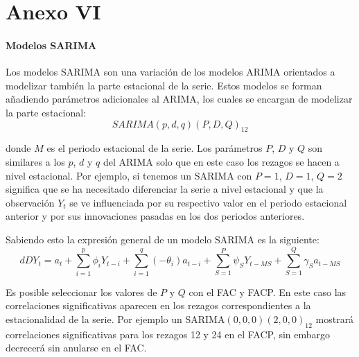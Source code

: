 \documentclass[12pt,a4paper,oneside]{article}
\begin{document}
\part*{Anexo VI}

\subsection*{Modelos SARIMA}
Los modelos SARIMA son una variación de los modelos ARIMA orientados a modelizar también la parte estacional de la serie. Estos modelos se forman añadiendo parámetros adicionales al ARIMA, los cuales se encargan de modelizar la parte estacional:
\begin{equation}
    SARIMA(p,d,q)(P,D,Q)_{12}
\end{equation}

\noindent donde $M$ es el periodo estacional de la serie. Los parámetros $P$, $D$ y $Q$ son similares a los $p$, $d$ y $q$ del ARIMA solo que en este caso los rezagos se hacen a nivel estacional. Por ejemplo, si tenemos un SARIMA con $P = 1$, $D = 1$, $Q = 2$ significa que se ha necesitado diferenciar la serie a nivel estacional y que la observación $Y_t$ se ve influenciada por su respectivo valor en el periodo estacional anterior y por sus innovaciones pasadas en los dos periodos anteriores.

Sabiendo esto la expresión general de un modelo SARIMA es la siguiente:
\begin{equation}
dDY_t = a_{t} + \sum_{i=1}^{p} \phi_{i} Y_{t-i} + \sum_{i=1}^{q} (-\theta_{i}) a_{t-i} + \sum_{S=1}^{P} \psi_{S} Y_{t-MS} + \sum_{S=1}^{Q} \gamma_{S} a_{t-MS}
\end{equation}

Es posible seleccionar los valores de $P$ y $Q$ con el FAC y FACP. En este caso las correlaciones significativas aparecen en los rezagos correspondientes a la estacionalidad de la serie. Por ejemplo un SARIMA$(0,0,0)(2,0,0)_{12}$ mostrará correlaciones significativas para los rezagos 12 y 24 en el FACP, sin embargo decrecerá sin anularse en el FAC.
\end{document}
